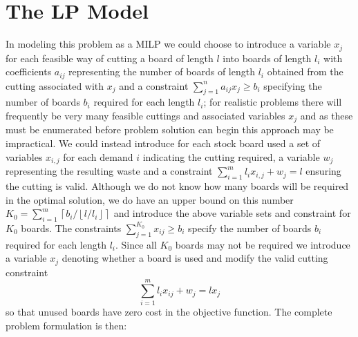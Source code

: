 \section{The LP Model}
In modeling this problem as a MILP we could choose to introduce a
variable $x_{j}$ for each feasible way of cutting a board of length
$l$ into boards of length $l_{i}$ with coefficients $a_{ij}$
representing the number of boards of length $l_{i}$ obtained from the
cutting associated with $x_{j}$ and a constraint
$\sum_{j=1}^{n}a_{ij}x_{j}\geq b_{i}$ specifying the number of boards
$b_{i}$ required for each length $l_{i}$; for realistic problems there
will frequently be very many feasible cuttings and associated
variables $x_{j}$ and as these must be enumerated before problem
solution can begin this approach may be impractical. We could instead
introduce for each stock board used a set of variables $x_{i,j}$ for
each demand $i$ indicating the cutting required, a variable $w_{j}$
representing the resulting waste and a constraint
$\sum_{i=1}^{m}l_{i}x_{i,j} + w_{j} = l$ ensuring the cutting is
valid. Although we do not know how many boards will be required in the
optimal solution, we do have an upper bound on this number
$K_{0}=\sum_{i=1}^{m}\left\lceil b_{i}/\left\lfloor
l/l_{i}\right\rfloor\right\rceil$ and introduce the above variable
sets and constraint for $K_{0}$ boards. The constraints
$\sum_{j=1}^{K_{0}}x_{ij}\geq b_{i}$ specify the number of boards
$b_{i}$ required for each length $l_{i}$. Since all $K_{0}$ boards may
not be required we introduce a variable $x_{j}$ denoting whether a
board is used and modify the valid cutting constraint
\begin{displaymath}
\sum_{i=1}^{m}l_{i}x_{ij}+w_{j}=lx_{j}
\end{displaymath}
so that unused boards have zero cost in the objective function. The complete problem formulation is then:
